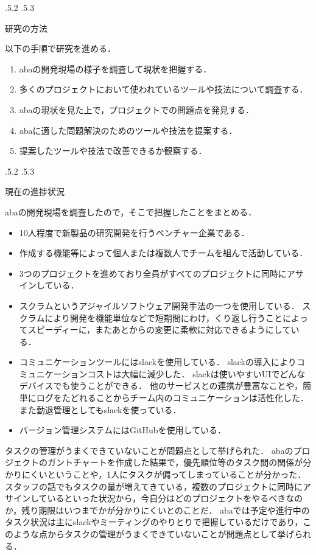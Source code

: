 \documentclass[uplatex]{jsarticle}
\makeatletter
\renewcommand{\section}{%
    \if@slide\clearpage\fi
    \@startsection{section}{1}{\z@}%
    {\Cvs \@plus.5\Cdp \@minus.2\Cdp}%
    {.5\Cvs \@plus.3\Cdp}%
    {\normalfont\raggedright}}
\makeatother
\begin{document}
\section{研究の方法}

以下の手順で研究を進める．
\begin{enumerate}
\item abaの開発現場の様子を調査して現状を把握する．
\item 多くのプロジェクトにおいて使われているツールや技法について調査する．
\item abaの現状を見た上で，プロジェクトでの問題点を発見する．
\item abaに適した問題解決のためのツールや技法を提案する．
\item 提案したツールや技法で改善できるか観察する．
\end{enumerate}



\section{現在の進捗状況}

abaの開発現場を調査したので，そこで把握したことをまとめる．
\begin{itemize}
\item 10人程度で新製品の研究開発を行うベンチャー企業である．
\item 作成する機能等によって個人または複数人でチームを組んで活動している．
\item 3つのプロジェクトを進めており全員がすべてのプロジェクトに同時にアサインしている．
\item スクラムというアジャイルソフトウェア開発手法の一つを使用している\cite{nagase2012}．
スクラムにより開発を機能単位などで短期間にわけ，くり返し行うことによってスピーディーに，またあとからの変更に柔軟に対応できるようにしている．
\item コミュニケーションツールにはslackを使用している．
slackの導入によりコミュニケーションコストは大幅に減少した．
slackは使いやすいUIでどんなデバイスでも使うことができる．
他のサービスとの連携が豊富なことや，簡単にログをたどれることからチーム内のコミュニケーションは活性化した．
また勤退管理としてもslackを使っている．
\item バージョン管理システムにはGitHubを使用している．
\end{itemize}


タスクの管理がうまくできていないことが問題点として挙げられた．
abaのプロジェクトのガントチャートを作成した結果で，優先順位等のタスク間の関係が分かりにくいということや，1人にタスクが偏ってしまっていることが分かった．
スタッフの話でもタスクの量が増えてきている，複数のプロジェクトに同時にアサインしているといった状況から，今自分はどのプロジェクトをやるべきなのか，残り期限はいつまでかが分かりにくいとのことだ．
abaでは予定や進行中のタスク状況は主にslackやミーティングのやりとりで把握しているだけであり，このような点からタスクの管理がうまくできていないことが問題点として挙げられる．
\end{document}
